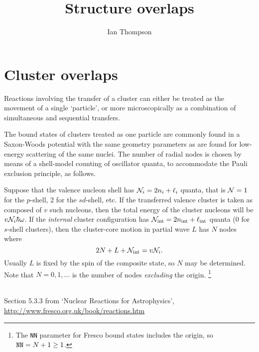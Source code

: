 \documentclass[11pt, oneside]{article}   	%
\title{Structure overlaps}
\author{Ian Thompson}
\date{}							%
\newcommand{\beq}{\begin{equation}}
\newcommand{\eeq}{\end{equation}}
\begin{document}
\maketitle


\section{Cluster overlaps}

Reactions involving the transfer of a cluster can either be treated as the
movement of a single `particle', or more microscopically as a combination of
simultaneous and sequential transfers.

The bound states of clusters treated as one particle are commonly found in a
Saxon-Woods potential with the same geometry parameters as are
found for low-energy scattering of the same nuclei. The number of
radial nodes is chosen by means of a shell-model counting of oscillator quanta,
to accommodate the Pauli exclusion principle, as follows.

Suppose that the valence nucleon shell has ${\cal N}_i =2 n_i + \ell_i$ quanta, that
is ${\cal N}=1$ for the $p$-shell, 2 for the $sd$-shell, etc. If the transferred valence cluster is taken
as composed of $v$ such nucleons, then the total energy of the cluster nucleons
will be $v {\cal N}_i \hbar\omega$. If the {\em internal} cluster configuration has
${\cal N}_{\rm int} = 2 n_{\rm int} + \ell_{\rm int}$ quanta (0 for $s$-shell clusters), then the
cluster-core motion in partial wave $L$ has $N$ nodes where 
\beq \label{cluster-q}
   2N + L + {\cal N}_{\rm int} = v {\cal N}_i .
\eeq
Usually $L$ is fixed by the spin of the composite state, so $N$ may be
determined.  Note that $N=0,1,\dots$ is the number of nodes {\em excluding} the
origin.%
\footnote{The {\tt NN} parameter for {\sc Fresco} bound states includes the
origin, so ${\tt NN} = N + 1 \geq 1$. }%

~ \\
Section 5.3.3 from `Nuclear Reactions for Astrophysics',\\
\url{http://www.fresco.org.uk/book/reactions.htm}
\end{document}
